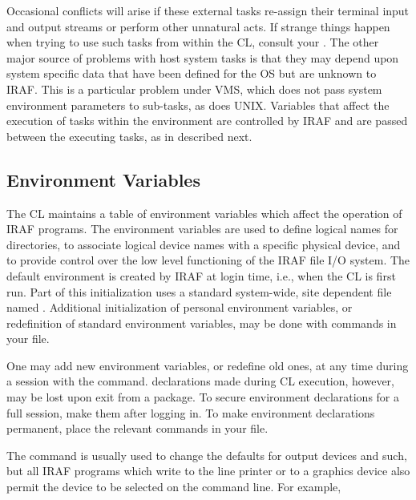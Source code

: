 Occasional conflicts will arise if these external tasks re-assign
their terminal input and output streams or perform other unnatural acts.
If strange things happen when trying to use such tasks from within
the CL, consult your .  The other major source of problems
with host system tasks is that they may depend upon system specific
data that have been defined for the OS but are unknown to IRAF.  This
is a particular problem under VMS, which does not pass system environment
parameters to sub-tasks, as does UNIX.  Variables that affect the 
execution of tasks within the environment are controlled by IRAF and
are passed between the executing tasks, as in described next.

\subsection{Environment Variables}

\ppind
The CL maintains a table of environment variables which 
affect the operation of  IRAF programs.
The environment variables are used to define logical names for directories,
to associate logical device names with a specific physical device, 
and to provide control over the low level functioning of the 
IRAF file I/O system.
The default environment is created by IRAF at login time, i.e., when the
CL is first run.  Part of this initialization uses a standard system-wide,
site dependent file named .  Additional
initialization of personal environment variables, or redefinition
of standard environment variables, may be done with commands
in your  file. 

One may add new environment variables, or redefine old ones, at any time during
a session with the  command.   declarations made
during CL execution, however, may be lost upon exit from a package.  To secure
environment declarations for a full session, make them 
after logging in.  To make environment declarations permanent, place the
relevant  commands in your  file.

The  command is usually used to change the 
defaults for output devices and such, but all IRAF programs which write to the
line printer or to a graphics device also permit the device to be selected on
the command line.  For example,

\begin{quotation}\noindent
{} 
\end{quotation}

